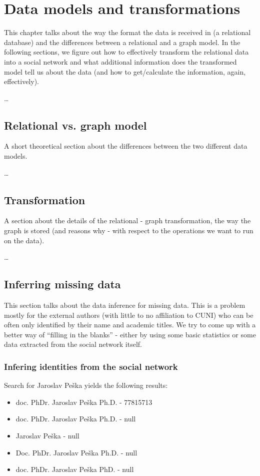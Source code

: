 \chapter{Data models and transformations}

This chapter talks about the way the format the data is received in (a relational database) and the differences between a relational and a graph model. In the following sections, we figure out how to effectively transform the relational data into a social network and what additional information does the transformed model tell us about the data (and how to get/calculate the information, again, effectively).  

\dots

\section{Relational vs. graph model}

A short theoretical section about the differences between the two different data models.

\dots

\section{Transformation}

A section about the details of the relational - graph transformation, the way the graph is stored (and reasons why - with respect to the operations we want to run on the data).

\dots

\section{Inferring missing data}

This section talks about the data inference for missing data. This is a problem mostly for the external authors (with little to no affiliation to CUNI) who can be often only identified by their name and academic titles. We try to come up with a better way of ``filling in the blanks'' - either by using some basic statistics or some data extracted from the social network itself.

\subsection{Infering identities from the social network}

Search for Jaroslav Peška yields the following results:
\begin{itemize}
    \item doc. PhDr. Jaroslav Peška Ph.D. - 77815713
    \item doc. PhDr. Jaroslav Peška Ph.D. - null
    \item Jaroslav Peška - null
    \item Doc. PhDr. Jaroslav Peška Ph.D. - null
    \item doc. PhDr. Jaroslav Peška PhD. - null
\end{itemize}

